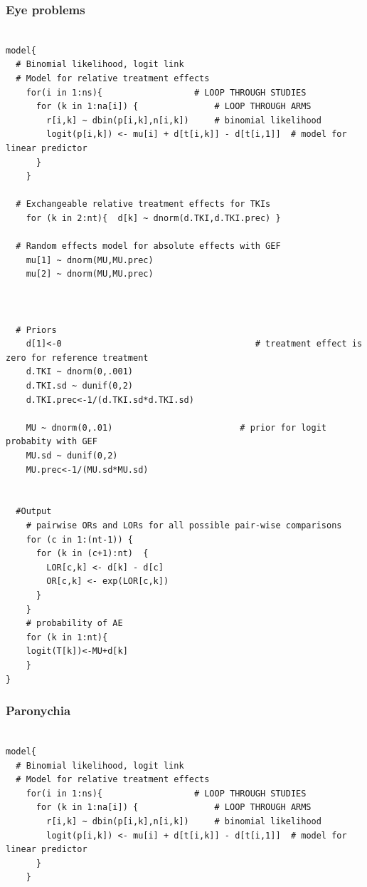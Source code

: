 \documentclass[11pt,final,fleqn]{article}\usepackage[]{graphicx}\usepackage[]{color}
\theoremstyle{plain}
\begin{document}
\begin{appendices}
\begin{verbatim}
\end{verbatim}

\subsubsection{Eye problems} 
\begin{verbatim} 

model{
  # Binomial likelihood, logit link
  # Model for relative treatment effects
    for(i in 1:ns){                  # LOOP THROUGH STUDIES
      for (k in 1:na[i]) {               # LOOP THROUGH ARMS
        r[i,k] ~ dbin(p[i,k],n[i,k])     # binomial likelihood
        logit(p[i,k]) <- mu[i] + d[t[i,k]] - d[t[i,1]]  # model for linear predictor
      }
    }   
  
  # Exchangeable relative treatment effects for TKIs
    for (k in 2:nt){  d[k] ~ dnorm(d.TKI,d.TKI.prec) }
  
  # Random effects model for absolute effects with GEF
    mu[1] ~ dnorm(MU,MU.prec) 
    mu[2] ~ dnorm(MU,MU.prec) 
  
       
       
  # Priors
    d[1]<-0                                      # treatment effect is zero for reference treatment
    d.TKI ~ dnorm(0,.001)
    d.TKI.sd ~ dunif(0,2) 
    d.TKI.prec<-1/(d.TKI.sd*d.TKI.sd)
      
    MU ~ dnorm(0,.01)                         # prior for logit probabity with GEF
    MU.sd ~ dunif(0,2) 
    MU.prec<-1/(MU.sd*MU.sd)
    
      
  #Output 
    # pairwise ORs and LORs for all possible pair-wise comparisons                                       
    for (c in 1:(nt-1)) {                        
      for (k in (c+1):nt)  { 
        LOR[c,k] <- d[k] - d[c]
        OR[c,k] <- exp(LOR[c,k])
      }  
    }
    # probability of AE
    for (k in 1:nt){ 
    logit(T[k])<-MU+d[k]
    }
}

\end{verbatim}

\subsubsection{Paronychia}
\begin{verbatim} 

model{
  # Binomial likelihood, logit link
  # Model for relative treatment effects
    for(i in 1:ns){                  # LOOP THROUGH STUDIES
      for (k in 1:na[i]) {               # LOOP THROUGH ARMS
        r[i,k] ~ dbin(p[i,k],n[i,k])     # binomial likelihood
        logit(p[i,k]) <- mu[i] + d[t[i,k]] - d[t[i,1]]  # model for linear predictor
      }
    }   
  

\end{verbatim}
\end{appendices}
\end{document}
